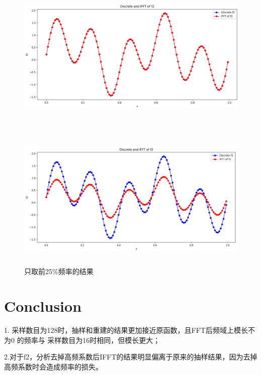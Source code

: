 \documentclass{ctexart}
\begin{document}
						\begin{figure}[H]
							\centering 
							\includegraphics[height=7cm,width=14cm]{5.png}
							\caption{}
						\end{figure}
							\begin{figure}[H]
								\centering 
								\includegraphics[height=7cm,width=14cm]{6.png}
								\caption{只取前25\%频率的结果}
							\end{figure}
		\section{Conclusion}
		1. 采样数目为128时，抽样和重建的结果更加接近原函数，且FFT后频域上模长不为0 的频率与 采样数目为16时相同，但模长更大；
		
		2.对于f2，分析去掉高频系数后IFFT的结果明显偏离于原来的抽样结果，因为去掉高频系数时会造成频率的损失。
		
		
    
\end{document}
